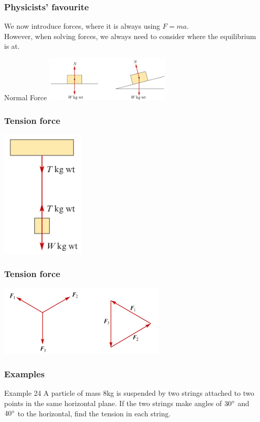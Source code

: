 \documentclass[
	11pt, %
]{beamer}
\newcommand{\blank}{\begin{frame}\end{frame}}
\begin{document}
\begin{frame}
    \frametitle{Physicists' favourite}
    We now introduce forces, where it is always using $F=ma$.\\
    However, when solving forces, we always need to consider where the equilibrium is at.\\
    \begin{block}{Normal Force}
        \centering
        \includegraphics[width = 6cm]{Normal}
    \end{block}
\end{frame}

\begin{frame}
    \frametitle{Tension force}
    \centering
    \includegraphics[width = 4cm]{Tension.png}
\end{frame}

\begin{frame}
    \frametitle{Tension force}
    \centering
    \includegraphics[width = 8cm]{Triangle.png}
\end{frame}

\begin{frame}[t]
    \frametitle{Examples}
    \begin{block}{Example 24}
        A particle of mass 8kg is suspended by two strings attached to two points in the same horizontal plane. 
        If the two strings make angles of $30\degree$ and $40\degree$ to the horizontal, find the tension in each string.
    \end{block}
\end{frame}
\blank
\end{document}
